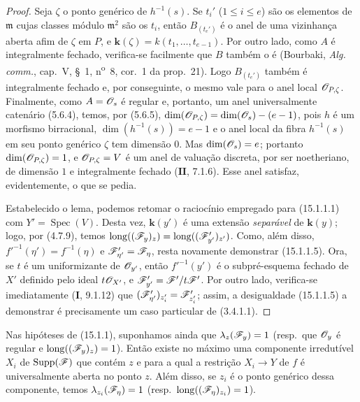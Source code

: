 \begin{proof}
Seja $\zeta$ o ponto genérico de $h^{-1}(s)$. Se $t_i'$ ($1\leqslant i\leqslant e$) são os elementos de $\mathfrak m$ cujas classes módulo $\mathfrak m^2$ são os $t_i$, então $B_{(t_e')}$ é o anel de uma vizinhança aberta afim de $\zeta$ em $P$, e $\mathbf{k}(\zeta)=k(t_1,\ldots,t_{e-1})$. Por outro lado, como $A$ é integralmente fechado, verifica-se facilmente que $B$ também o é (Bourbaki, \emph{Alg. comm.}, cap.~V, \S~1, n\textsuperscript{o}~8, cor.~1 da prop.~21). Logo $B_{(t_e')}$ também é integralmente fechado e, por conseguinte, o mesmo vale para o anel local $\mathscr{O}_{P,\zeta}$. Finalmente, como $A=\mathscr{O}_s$ é regular e, portanto, um anel universalmente catenário (5.6.4), temos, por (5.6.5),
$\dim(\mathscr{O}_{P,\zeta})=\dim(\mathscr{O}_s)-(e-1)$, pois $h$ é um morfismo birracional, $\dim(h^{-1}(s))=e-1$ e o anel local da fibra $h^{-1}(s)$ em seu ponto genérico $\zeta$ tem dimensão $0$. Mas $\dim(\mathscr{O}_s)=e$; portanto $\dim(\mathscr{O}_{P,\zeta})=1$, e $\mathscr{O}_{P,\zeta}=V$ é um anel de valuação discreta, por ser noetheriano, de dimensão $1$ e integralmente fechado ($\textbf{II}$, 7.1.6). Esse anel satisfaz, evidentemente, o que se pedia.

Estabelecido o lema, podemos retomar o raciocínio empregado para (15.1.1.1) com $Y'=\operatorname{Spec}(V)$. Desta vez, $\mathbf{k}(y')$ é uma extensão \emph{separável} de $\mathbf{k}(y)$; logo, por (4.7.9), temos $\operatorname{long}((\mathscr{F}_y)_z)=\operatorname{long}((\mathscr{F}'_{y'})_{z'})$. Como, além disso, $f'^{-1}(\eta')=f^{-1}(\eta)$ e $\mathscr{F}'_{\eta'}=\mathscr{F}_\eta$, resta novamente demonstrar (15.1.1.5). Ora, se $t$ é um uniformizante de $\mathscr{O}_{y'}$, então $f'^{-1}(y')$ é o subpré-esquema fechado de $X'$ definido pelo ideal $t\mathscr{O}_{X'}$, e $\mathscr{F}'_{y'}=\mathscr{F}'/t\mathscr{F}'$. Por outro lado, verifica-se imediatamente ($\textbf{I}$, 9.1.12) que $(\mathscr{F}'_{\eta'})_{z_i'}=\mathscr{F}'_{z_i'}$; assim, a desigualdade (15.1.1.5) a demonstrar é precisamente um caso particular de (3.4.1.1).
\end{proof}

\begin{corollary}[15.1.2]
\label{IV.15.1.2}
Nas hipóteses de (15.1.1), suponhamos ainda que $\lambda_z(\mathscr{F}_y)=1$ (resp.\ que $\mathscr{O}_y$ é regular e $\operatorname{long}((\mathscr{F}_y)_z)=1$). Então existe no máximo uma componente irredutível $X_i$ de $\operatorname{Supp}(\mathscr{F})$ que contém $z$ e para a qual a restrição $X_i\to Y$ de $f$ é universalmente aberta no ponto $z$. Além disso, se $z_i$ é o ponto genérico dessa componente, temos $\lambda_{z_i}(\mathscr{F}_\eta)=1$ (resp.\ $\operatorname{long}((\mathscr{F}_\eta)_{z_i})=1$).
\end{corollary}

